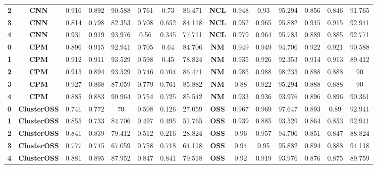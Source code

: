 {{\begin{tabular}{c|c|cccccc|ccccccc}
\textbf{2} & \textbf{CNN} & 0.916 & 0.892 & 90.588 & 0.761 & 0.73  & 86.471 & \multicolumn{1}{c|}{\textbf{NCL}} & 0.948 & 0.93  & 95.294 & 0.856 & 0.846 & 91.765 \\
\textbf{3} & \textbf{CNN} & 0.814 & 0.798 & 82.353 & 0.708 & 0.652 & 84.118 & \multicolumn{1}{c|}{\textbf{NCL}} & 0.952 & 0.965 & 95.882 & 0.915 & 0.915 & 92.941 \\
\textbf{4} & \textbf{CNN} & 0.931 & 0.919 & 93.976 & 0.56  & 0.345 & 77.711 & \multicolumn{1}{c|}{\textbf{NCL}} & 0.979 & 0.964 & 95.783 & 0.889 & 0.885 & 92.771 \\
\textbf{0} & \textbf{CPM} & 0.896 & 0.915 & 92.941 & 0.705 & 0.64  & 84.706 & \multicolumn{1}{c|}{\textbf{NM}} & 0.949 & 0.949 & 94.706 & 0.922 & 0.921 & 90.588 \\
\textbf{1} & \textbf{CPM} & 0.912 & 0.911 & 93.529 & 0.598 & 0.45  & 78.824 & \multicolumn{1}{c|}{\textbf{NM}} & 0.935 & 0.926 & 92.353 & 0.914 & 0.913 & 89.412 \\
\textbf{2} & \textbf{CPM} & 0.915 & 0.894 & 93.529 & 0.746 & 0.704 & 86.471 & \multicolumn{1}{c|}{\textbf{NM}} & 0.985 & 0.988 & 98.235 & 0.888 & 0.888 & 90 \\
\textbf{3} & \textbf{CPM} & 0.927 & 0.868 & 87.059 & 0.779 & 0.761 & 85.882 & \multicolumn{1}{c|}{\textbf{NM}} & 0.88  & 0.922 & 95.294 & 0.888 & 0.888 & 90 \\
\textbf{4} & \textbf{CPM} & 0.885 & 0.883 & 90.964 & 0.754 & 0.725 & 85.542 & \multicolumn{1}{c|}{\textbf{NM}} & 0.933 & 0.936 & 93.976 & 0.896 & 0.896 & 90.361 \\
\textbf{0} & \textbf{ClusterOSS} & 0.741 & 0.772 & 70    & 0.508 & 0.126 & 27.059 & \multicolumn{1}{c|}{\textbf{OSS}} & 0.967 & 0.969 & 97.647 & 0.893 & 0.89  & 92.941 \\
\textbf{1} & \textbf{ClusterOSS} & 0.855 & 0.733 & 84.706 & 0.497 & 0.495 & 51.765 & \multicolumn{1}{c|}{\textbf{OSS}} & 0.939 & 0.885 & 93.529 & 0.864 & 0.853 & 92.941 \\
\textbf{2} & \textbf{ClusterOSS} & 0.841 & 0.839 & 79.412 & 0.512 & 0.216 & 28.824 & \multicolumn{1}{c|}{\textbf{OSS}} & 0.96  & 0.957 & 94.706 & 0.851 & 0.847 & 88.824 \\
\textbf{3} & \textbf{ClusterOSS} & 0.777 & 0.745 & 67.059 & 0.758 & 0.718 & 64.118 & \multicolumn{1}{c|}{\textbf{OSS}} & 0.94  & 0.95  & 95.882 & 0.894 & 0.888 & 94.118 \\
\textbf{4} & \textbf{ClusterOSS} & 0.881 & 0.895 & 87.952 & 0.847 & 0.841 & 79.518 & \multicolumn{1}{c|}{\textbf{OSS}} & 0.92  & 0.919 & 93.976 & 0.876 & 0.875 & 89.759 \\

\end{tabular}}}

